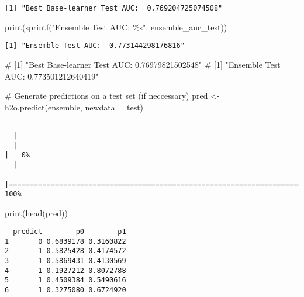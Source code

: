 \documentclass[
  letterpaper,
  DIV=11,
  numbers=noendperiod]{scrartcl}
\newenvironment{Shaded}{\begin{snugshade}}{\end{snugshade}}
\newcommand{\AttributeTok}[1]{\textcolor[rgb]{0.40,0.45,0.13}{#1}}
\newcommand{\CommentTok}[1]{\textcolor[rgb]{0.37,0.37,0.37}{#1}}
\newcommand{\FunctionTok}[1]{\textcolor[rgb]{0.28,0.35,0.67}{#1}}
\newcommand{\NormalTok}[1]{\textcolor[rgb]{0.00,0.23,0.31}{#1}}
\newcommand{\OtherTok}[1]{\textcolor[rgb]{0.00,0.23,0.31}{#1}}
\newcommand{\StringTok}[1]{\textcolor[rgb]{0.13,0.47,0.30}{#1}}
\begin{document}
\begin{verbatim}
[1] "Best Base-learner Test AUC:  0.769204725074508"
\end{verbatim}

\begin{Shaded}
\begin{Highlighting}[]
\FunctionTok{print}\NormalTok{(}\FunctionTok{sprintf}\NormalTok{(}\StringTok{"Ensemble Test AUC:  \%s"}\NormalTok{, ensemble\_auc\_test))}
\end{Highlighting}
\end{Shaded}

\begin{verbatim}
[1] "Ensemble Test AUC:  0.773144298176816"
\end{verbatim}

\begin{Shaded}
\begin{Highlighting}[]
\CommentTok{\# [1] "Best Base{-}learner Test AUC:  0.76979821502548"}
\CommentTok{\# [1] "Ensemble Test AUC:  0.773501212640419"}

\CommentTok{\# Generate predictions on a test set (if neccessary)}
\NormalTok{pred }\OtherTok{\textless{}{-}} \FunctionTok{h2o.predict}\NormalTok{(ensemble, }\AttributeTok{newdata =}\NormalTok{ test)}
\end{Highlighting}
\end{Shaded}

\begin{verbatim}

  |                                                                            
  |                                                                      |   0%
  |                                                                            
  |======================================================================| 100%
\end{verbatim}

\begin{Shaded}
\begin{Highlighting}[]
\FunctionTok{print}\NormalTok{(}\FunctionTok{head}\NormalTok{(pred))}
\end{Highlighting}
\end{Shaded}

\begin{verbatim}
  predict        p0        p1
1       0 0.6839178 0.3160822
2       1 0.5825428 0.4174572
3       1 0.5869431 0.4130569
4       1 0.1927212 0.8072788
5       1 0.4509384 0.5490616
6       1 0.3275080 0.6724920
\end{verbatim}
\end{document}
